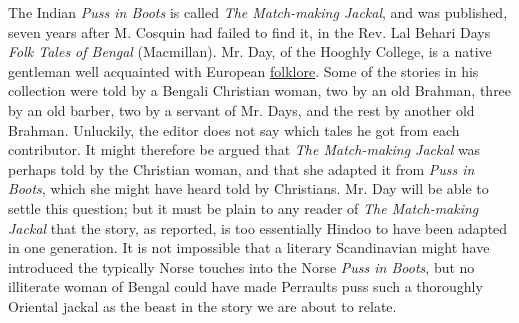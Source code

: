 \documentclass[14pt,a4paper]{memoir}
\newcommand{\ul}[1]{\uline{#1}}
\begin{document}
The Indian \emph{Puss in Boots} is called \emph{The Match-making
Jackal}, and was published, seven years after M. Cosquin had failed to
find it, in the Rev. Lal Behari Day\textquotesingle s \emph{Folk Tales
of Bengal} (Macmillan). Mr. Day, of the Hooghly College, is a native
gentleman well acquainted with European \ul{folklore}. Some of the
stories in his collection were told by a Bengali Christian woman, two by
an old Brahman, three by an old barber, two by a servant of Mr.
Day\textquotesingle s, and the rest by another old Brahman. Unluckily,
the editor does not say which tales he got from each contributor. It
might therefore be argued that \emph{The Match-making Jackal} was
perhaps told by the Christian woman, and that she adapted it from
\emph{Puss in Boots}, which she might have heard told by Christians. Mr.
Day will be able to settle this question; but it must be plain to any
reader of \emph{The Match-making Jackal} that the story, as reported, is
too essentially Hindoo to have been
\textquotesingle adapted\textquotesingle{} in one generation. It is not
impossible that a literary Scandinavian might have introduced the
typically Norse touches into the Norse \emph{Puss in Boots}, but no
illiterate woman of Bengal could have made Perrault\textquotesingle s
puss such a thoroughly Oriental jackal as the beast in the story we are
about to relate.
\end{document}
